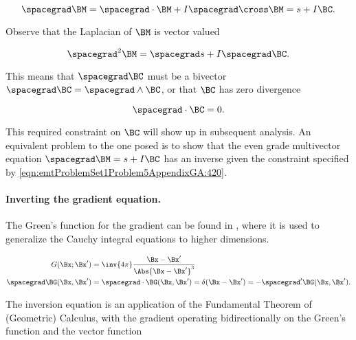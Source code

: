 \begin{equation}\label{eqn:emtProblemSet1Problem5AppendixGA:60}
\spacegrad \BM
= \spacegrad \cdot \BM + I \spacegrad \cross \BM
= s + I \BC.
\end{equation}

Observe that the Laplacian of \( \BM \) is vector valued

\begin{dmath}\label{eqn:emtProblemSet1Problem5AppendixGA:400}
\spacegrad^2 \BM
= \spacegrad s + I \spacegrad \BC.
\end{dmath}

This means that \( \spacegrad \BC \) must be a bivector \( \spacegrad \BC = \spacegrad \wedge \BC \), or that \( \BC \) has zero divergence

\begin{dmath}\label{eqn:emtProblemSet1Problem5AppendixGA:420}
\spacegrad \cdot \BC = 0.
\end{dmath}

This required constraint on \( \BC \) will show up in subsequent analysis.  An equivalent problem to the one posed 
is to show that
the even grade multivector equation \( \spacegrad \BM = s + I \BC \) has an inverse given the constraint
specified by \cref{eqn:emtProblemSet1Problem5AppendixGA:420}.

\paragraph{Inverting the gradient equation.}

The Green's function for the gradient can be found in \citep{doran2003gap}, where it is used to generalize the Cauchy integral equations to higher dimensions.

\begin{dmath}\label{eqn:emtProblemSet1Problem5AppendixGA:80}
\begin{aligned}
G(\Bx ; \Bx') &= \inv{4 \pi} \frac{ \Bx - \Bx' }{\Abs{\Bx - \Bx'}^3} \\
\spacegrad \BG(\Bx, \Bx') &= \spacegrad \cdot \BG(\Bx, \Bx') = \delta(\Bx - \Bx') = -\spacegrad' \BG(\Bx, \Bx').
\end{aligned}
\end{dmath}

The inversion equation is an application of the Fundamental Theorem of (Geometric) Calculus, with the gradient operating bidirectionally on the Green's function and the vector function

